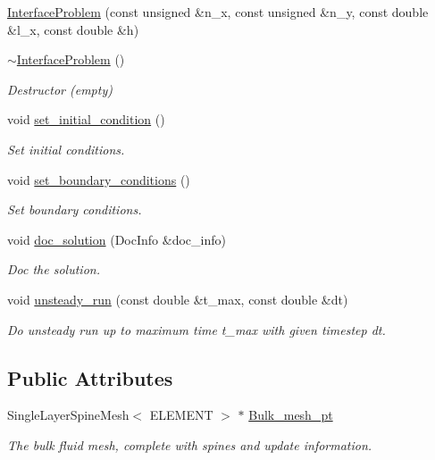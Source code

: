 \begin{DoxyCompactItemize}
\hyperlink{classInterfaceProblem_a83023535d663a2a6558959f36bf6e1e7}{Interface\+Problem} (const unsigned \&n\+\_\+x, const unsigned \&n\+\_\+y, const double \&l\+\_\+x, const double \&h)
\item 
\hyperlink{classInterfaceProblem_a90c191f8046069099b199743e7ce7111}{$\sim$\+Interface\+Problem} ()
\begin{DoxyCompactList}\small\item\em Destructor (empty) \end{DoxyCompactList}\item 
void \hyperlink{classInterfaceProblem_a0d3af8378c4f0a6e38636be958c300d5}{set\+\_\+initial\+\_\+condition} ()
\begin{DoxyCompactList}\small\item\em Set initial conditions. \end{DoxyCompactList}\item 
void \hyperlink{classInterfaceProblem_a844445832ad7a32aa9f5d03ffdb40ebb}{set\+\_\+boundary\+\_\+conditions} ()
\begin{DoxyCompactList}\small\item\em Set boundary conditions. \end{DoxyCompactList}\item 
void \hyperlink{classInterfaceProblem_a49714e35e94f7d2af0b6ddd22b851f52}{doc\+\_\+solution} (Doc\+Info \&doc\+\_\+info)
\begin{DoxyCompactList}\small\item\em Doc the solution. \end{DoxyCompactList}\item 
void \hyperlink{classInterfaceProblem_adf1f4e43d10939e4323e0e315b711085}{unsteady\+\_\+run} (const double \&t\+\_\+max, const double \&dt)
\begin{DoxyCompactList}\small\item\em Do unsteady run up to maximum time t\+\_\+max with given timestep dt. \end{DoxyCompactList}\end{DoxyCompactItemize}
\subsection*{Public Attributes}
\begin{DoxyCompactItemize}
\item 
Single\+Layer\+Spine\+Mesh$<$ E\+L\+E\+M\+E\+NT $>$ $\ast$ \hyperlink{classInterfaceProblem_a3e9ad7667f6f978a1e7c4c55e8e69e6d}{Bulk\+\_\+mesh\+\_\+pt}
\begin{DoxyCompactList}\small\item\em The bulk fluid mesh, complete with spines and update information. \end{DoxyCompactList}\end{DoxyCompactItemize}
